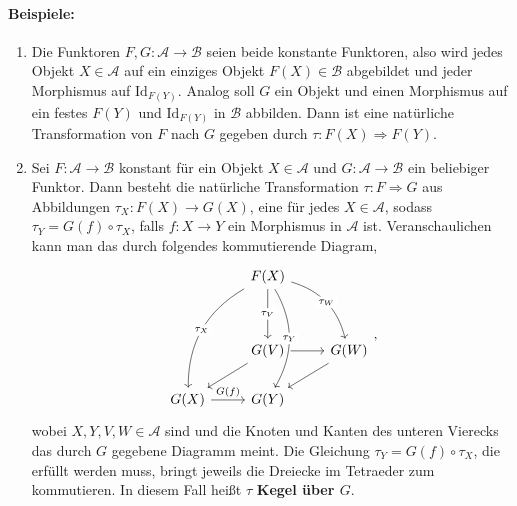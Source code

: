 \documentclass{article}
\theoremstyle{plain}
\theoremstyle{definition}
\theoremstyle{remark}
\begin{document}
\paragraph{Beispiele:}
\begin{enumerate}
	\item Die Funktoren $F,G: \mathcal{A} \rightarrow \mathcal{B}$ seien beide konstante Funktoren, also wird jedes Objekt $X \in \mathcal{A}$ auf ein einziges Objekt $F(X) \in \mathcal{B}$ abgebildet und jeder Morphismus auf $\text{Id}_{F(Y)}$. Analog soll $G$ ein Objekt und einen Morphismus auf ein festes $F(Y)$ und $\text{Id}_{F(Y)}$ in $\mathcal{B}$ abbilden. Dann ist eine natürliche Transformation von $F$ nach $G$ gegeben durch $\tau: F(X) \Longrightarrow F(Y)$.
	\item Sei $F: \mathcal{A} \rightarrow \mathcal{B}$ konstant für ein Objekt $X \in \mathcal{A}$ und $G: \mathcal{A} \rightarrow \mathcal{B}$ ein beliebiger Funktor. Dann besteht die natürliche Transformation $\tau: F \Longrightarrow G$ aus Abbildungen $\tau_{X}: F(X) \rightarrow G(X)$, eine für jedes $X \in \mathcal{A}$, sodass $\tau_Y = G(f) \circ \tau_X$, falls $f:X \rightarrow Y$ ein Morphismus in $\mathcal{A}$ ist. Veranschaulichen kann man das durch folgendes kommutierende Diagram, 
	\begin{equation}
		\begin{tikzcd}
		               & F(X) \arrow[lddd, "\tau_X" description, bend right] \arrow[dd, "\tau_V" description] \arrow[rdd, "\tau_W" description, bend left] \arrow[ddd, "\tau_Y" description, bend left] &                 \\
		               &                                                                                                                                                                             &                 \\
		               & G(V) \arrow[r] \arrow[ld]                                                                                                                                                   & G(W) \arrow[ld] \\
		G(X) \arrow[r, "G(f)"] & G(Y)                                                                                                                                                                        &                
		\end{tikzcd},
	\end{equation}
	wobei $X,Y,V,W \in \mathcal{A}$ sind und die Knoten und Kanten des unteren Vierecks das durch $G$ gegebene Diagramm meint. Die Gleichung $\tau_Y = G(f) \circ \tau_X$, die erfüllt werden muss, bringt jeweils die Dreiecke im Tetraeder zum kommutieren. In diesem Fall heißt $\tau$ \textbf{Kegel über $G$}.

\end{enumerate}
\end{document}
